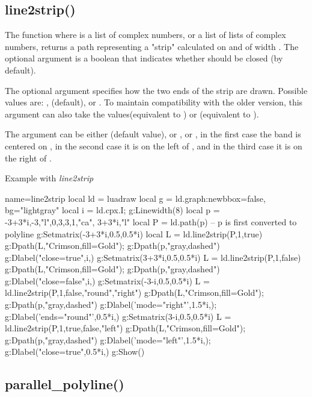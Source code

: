 \subsection{line2strip()}

The function  where  is a list of complex numbers, or a list of lists of complex numbers, returns a path representing a "strip" calculated on  and of width . The optional argument  is a boolean that indicates whether  should be closed (\false by default). 

The optional argument  specifies how the two ends of the strip are drawn. Possible values ​​are: ,  (default), or . To maintain compatibility with the older version, this argument can also take the values ​​\true (equivalent to ) or \false (equivalent to ). 

The argument  can be either  (default value), or , or , in the first case the band is centered on , in the second case it is on the left of , and in the third case it is on the right of .

\begin{demo}{Example with \emph{line2strip}}
\begin{luadraw}{name=line2strip}
local ld = luadraw
local g = ld.graph:new{bbox=false, bg="lightgray"}
local i = ld.cpx.I; g:Linewidth(8)
local p = {-3+3*i,-3,"l",0,3,3,1,"ca", 3+3*i,"l"}
local P = ld.path(p)  -- p is first converted to polyline
g:Setmatrix({-3+3*i,0.5,0.5*i})
local L = ld.line2strip(P,1,true)
g:Dpath(L,"Crimson,fill=Gold"); g:Dpath(p,"gray,dashed")
g:Dlabel("close=true",i,{})
g:Setmatrix({3+3*i,0.5,0.5*i})
L = ld.line2strip(P,1,false)
g:Dpath(L,"Crimson,fill=Gold"); g:Dpath(p,"gray,dashed")
g:Dlabel("close=false",i,{})
g:Setmatrix({-3-i,0.5,0.5*i})
L = ld.line2strip(P,1,false,"round","right")
g:Dpath(L,"Crimson,fill=Gold"); g:Dpath(p,"gray,dashed")
g:Dlabel('mode="right"',1.5*i,{}); g:Dlabel('ends="round"',0.5*i,{})
g:Setmatrix({3-i,0.5,0.5*i})
L = ld.line2strip(P,1,true,false,"left")
g:Dpath(L,"Crimson,fill=Gold"); g:Dpath(p,"gray,dashed")
g:Dlabel('mode="left"',1.5*i,{}); g:Dlabel("close=true",0.5*i,{})
g:Show()
\end{luadraw}
\end{demo}

\subsection{parallel\_polyline()}


